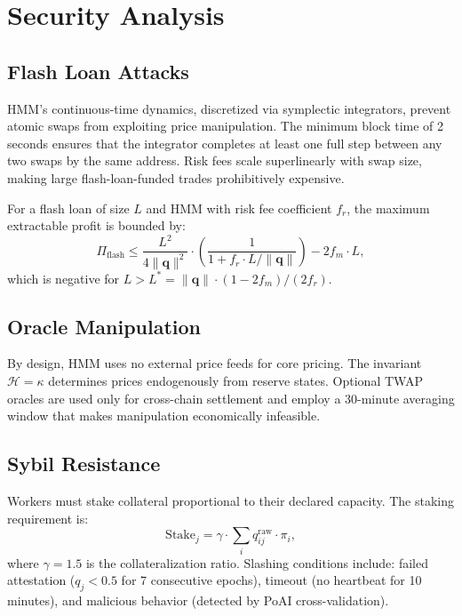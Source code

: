 \section{Security Analysis}

\label{sec:security}

\subsection{Flash Loan Attacks}

HMM's continuous-time dynamics, discretized via symplectic integrators, prevent atomic swaps from exploiting price manipulation. The minimum block time of 2 seconds ensures that the integrator completes at least one full step between any two swaps by the same address. Risk fees scale superlinearly with swap size, making large flash-loan-funded trades prohibitively expensive.

\begin{theorem}
For a flash loan of size $L$ and HMM with risk fee coefficient $f_r$, the maximum extractable profit is bounded by:
\begin{equation}
\Pi_{\text{flash}} \le \frac{L^2}{4\|\bm{q}\|^2} \cdot \left(\frac{1}{1 + f_r \cdot L/\|\bm{q}\|}\right) - 2f_m \cdot L,
\end{equation}
which is negative for $L > L^* = \|\bm{q}\| \cdot (1 - 2f_m)/(2f_r)$.
\end{theorem}

\subsection{Oracle Manipulation}

By design, HMM uses no external price feeds for core pricing. The invariant $\mathcal{H} = \kappa$ determines prices endogenously from reserve states. Optional TWAP oracles are used only for cross-chain settlement and employ a 30-minute averaging window that makes manipulation economically infeasible.

\subsection{Sybil Resistance}

Workers must stake collateral proportional to their declared capacity. The staking requirement is:
\begin{equation}
\text{Stake}_j = \gamma \cdot \sum_i q_{ij}^{\text{raw}} \cdot \pi_i,
\end{equation}
where $\gamma = 1.5$ is the collateralization ratio. Slashing conditions include: failed attestation ($q_j < 0.5$ for 7 consecutive epochs), timeout (no heartbeat for 10 minutes), and malicious behavior (detected by PoAI cross-validation).

